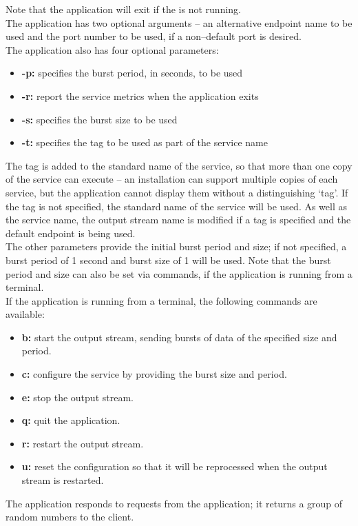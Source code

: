 Note that the application will exit if the
 is not running.\\

The application has two optional arguments -- an alternative endpoint name to be used and
the port number to be used, if a non--default port is desired.\\

The application also has four optional parameters:
\begin{itemize}
\item \textbf{-p:} specifies the burst period, in seconds, to be used 
\item \textbf{-r:} report the service metrics when the application exits
\item \textbf{-s:} specifies the burst size to be used
\item \textbf{-t:} specifies the tag to be used as part of the service name
\end{itemize}
The tag is added to the standard name of the service, so that more than one copy of the
service can execute -- an \mplusm{} installation can support multiple copies of each
 service, but the 
application cannot display them without a distinguishing `tag'.
If the tag is not specified, the standard name of the service will be used.
As well as the service name, the output stream name is modified if a tag is specified and
the default endpoint is being used.\\

The other parameters provide the initial burst period and size; if not specified, a burst
period of 1 second and burst size of 1 will be used.
Note that the burst period and size can also be set via commands, if the application is
running from a terminal.\\

If the application is running from a terminal, the following commands are available:
\begin{itemize}
\item \textbf{b:} start the output stream, sending bursts of data of the specified size
and period. 
\item \textbf{c:} configure the service by providing the burst size and period. 
\item \textbf{e:} stop the output stream. 
\item \textbf{q:} quit the application. 
\item \textbf{r:} restart the output stream. 
\item \textbf{u:} reset the configuration so that it will be reprocessed when the output
stream is restarted. 
\end{itemize}
The  application responds to
 requests from the
 application; it returns a group of random
numbers to the client.\\

